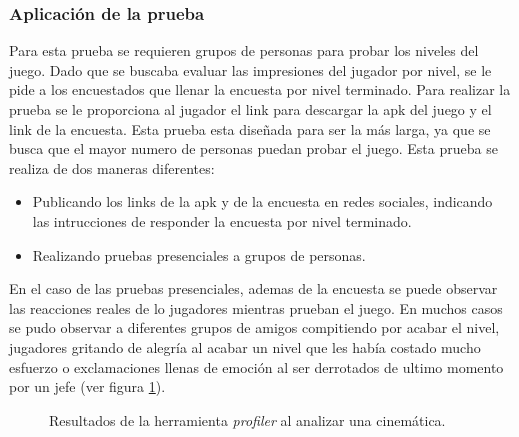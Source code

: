 \subsubsection{Aplicación de la prueba}
Para esta prueba se requieren grupos de personas para probar los niveles del 
juego. Dado que se buscaba evaluar las impresiones del jugador por nivel, se le 
pide a los encuestados que llenar la encuesta por nivel terminado. Para realizar 
la prueba se le proporciona al jugador el link para descargar la apk del juego 
y el link de la encuesta. Esta prueba esta diseñada para ser la más larga, ya que 
se busca que el mayor numero de personas puedan probar el juego. Esta prueba se 
realiza de dos maneras diferentes:
\begin{itemize}
        \item Publicando los links de la apk y de la encuesta en redes sociales, 
        indicando las intrucciones de responder la encuesta por nivel terminado.
        \item Realizando pruebas presenciales a grupos de personas.
\end{itemize}
En el caso de las pruebas presenciales, ademas de la encuesta se puede observar 
las reacciones reales de lo jugadores mientras prueban el juego. En muchos 
casos se pudo observar a diferentes grupos de amigos compitiendo por acabar el 
nivel, jugadores gritando de alegría al acabar un nivel que les había costado 
mucho esfuerzo o exclamaciones llenas de emoción al ser derrotados de ultimo 
momento por un jefe (ver figura \ref{fig:AlumnosESCOM}).
\begin{figure}
  \centering
  
        
  \caption{Resultados de la herramienta \textit{profiler} al analizar una cinemática.}
  \label{fig:AlumnosESCOM}
\end{figure} 
